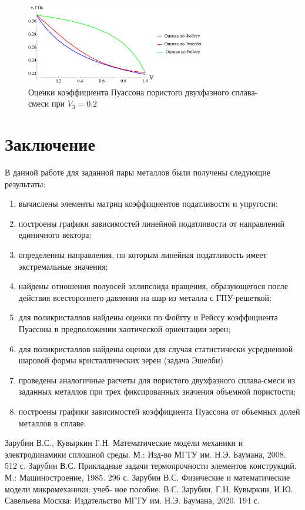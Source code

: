 \documentclass[12pt, a4paper]{article}
\begin{document}
\begin{figure}[!htbp]
	\centering
	\includegraphics[width=0.7\textwidth]{v-p-3}%
	\caption{Оценки коэффициента Пуассона пористого двухфазного сплава-смеси при $V_3 = 0.2$}
	\vspace*{-2mm}
	\label{puasson-pic-p-1}
\end{figure}


\newpage
\section{Заключение}

В данной работе для заданной пары металлов были получены следующие результаты:
\begin{enumerate}
\item вычислены элементы матриц коэффициентов податливости и упругости;
\item построены графики зависимостей линейной податливости от направлений единичного вектора;
\item определенны направления, по которым линейная податливость имеет экстремальные значения;
\item найдены отношения полуосей эллипсоида вращения, образующегося после действия всестороннего давления на шар из металла с ГПУ-решеткой;
\item для поликристаллов найдены оценки по Фойгту и Рейссу коэффициента Пуассона в предположении хаотической ориентации зерен;
\item для поликристаллов найдены оценки для случая статистически усредненной шаровой формы кристаллических зерен (задача Эшелби)
\item проведены аналогичные расчеты для пористого двухфазного сплава-смеси из заданных металлов при трех фиксированных значения объемной пористости;
\item построены графики зависимостей коэффициента Пуассона от объемных долей металлов в сплаве.

\end{enumerate}

\newpage
\begin{thebibliography}{2}
 Зарубин В.С., Кувыркин Г.Н. Математические модели механики и электродинамики сплошной среды. М.: Изд-во МГТУ им. Н.Э. Баумана, 2008. 512 с.
 Зарубин В.С. Прикладные задачи термопрочности элементов конструкций. М.: Машиностроение, 1985. 296 с.
 Зарубин В.С. Физические и математические модели микромеханики: учеб-
ное пособие. В.С. Зарубин, Г.Н. Кувыркин, И.Ю. Савельева Москва: Издательство МГТУ им. Н.Э. Баумана, 2020. 194 с.

\end{thebibliography}
\end{document}
